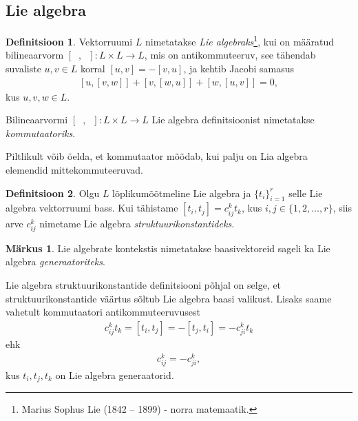 \documentclass[12pt,a4paper,oneside]{article}
\theoremstyle{plain}
\theoremstyle{definition}
\newtheorem{definitsioon}{Definitsioon}[section]
\newtheorem{markus}{Märkus}[section]
\numberwithin{equation}{section}
\begin{document}
\subsection{Lie algebra}

\begin{definitsioon} \label{def:lie-algebra}
Vektorruumi $L$ nimetatakse \emph{Lie algebraks}\footnote{
Marius Sophus Lie (1842 – 1899) - norra matemaatik.}, kui on 
määratud bilineaarvorm $\left[\phantom{u},\phantom{u}\right] : 
L \times L \rightarrow L$, mis on antikommuteeruv, see tähendab 
suvaliste $u, v \in L$ korral 
$\left[u, v\right] = - \left[v, u\right]$,
ja kehtib Jacobi samasus 
\begin{align*}
\left[u, \left[v, w\right]\right] + 
\left[v, \left[w, u\right]\right] + 
\left[w, \left[u, v\right]\right] = 0,
\end{align*}
kus $u, v, w \in L$.
\end{definitsioon}

Bilineaarvormi $\left[\phantom{u}, \phantom{u}\right] : 
L \times L \rightarrow L$ Lie algebra definitsioonist nimetatakse 
\emph{kommutaatoriks}.

Piltlikult võib öelda, et kommutaator mõõdab, kui palju on Lia 
algebra elemendid mittekommuteeruvad.

\begin{definitsioon}
Olgu $L$ lõplikumõõtmeline Lie algebra ja $\{t_i\}_{i = 1}^{r}$ 
selle Lie algebra vektorruumi bass. Kui tähistame 
$\left[t_i, t_j\right] = c_{ij}^{k} t_{k}$, kus 
$i,j \in \{1, 2, \ldots, r\}$, siis arve $c_{ij}^{k}$ nimetame Lie 
algebra \emph{struktuurikonstantideks}.
\end{definitsioon}

\begin{markus}
Lie algebrate kontekstis nimetatakse baasivektoreid sageli ka 
Lie algebra \emph{generaatoriteks}.
\end{markus}

Lie algebra struktuurikonstantide definitsiooni põhjal on selge, et 
struktuurikonstantide väärtus sõltub Lie algebra baasi valikust. 
Lisaks saame vahetult kommutaatori antikommuteeruvusest
\begin{align*}
c_{ij}^{k} t_k = \left[t_i, t_j\right] = - \left[t_j, t_i\right] = 
-c_{ji}^{k} t_k
\end{align*}
ehk
\begin{align} \label{eq:struktuurikonst-antikomm}
c_{ij}^{k} = -c_{ji}^{k},
\end{align}
kus $t_i, t_j, t_k$ on Lie algebra generaatorid.
\end{document}
